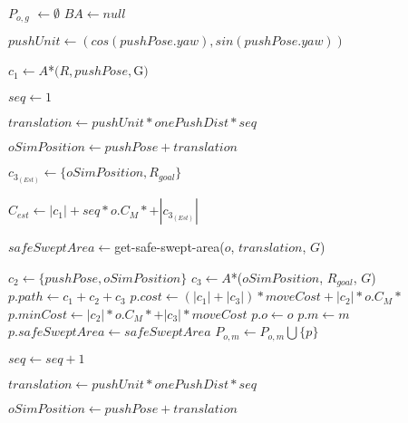 \begin{algorithm}[H]
  \begin{algorithmic}[1]


      \State $P_{o,g}$ $\gets \emptyset$
      \State $BA \gets null$

        \State $pushUnit \gets (cos(pushPose.yaw), sin(pushPose.yaw))$

        \State $c_{1} \gets A$*$(R, pushPose, $G$)$

        \State $seq \gets 1$

        \State $translation \gets pushUnit * onePushDist * seq$

        \State $oSimPosition \gets pushPose + translation$

        \State {}

        \State $c_{3_{(Est)}} \gets \{oSimPosition, R_{goal}\}$

        \State $C_{est} \gets |c_{1}| + seq * o.C_{M} * $$ + |c_{3_{(Est)}}|$

        \State $safeSweptArea \gets $get-safe-swept-area($o$, $translation$, $G$)


            \State $c_{2} \gets \{pushPose, oSimPosition\}$
            \State $c_{3} \gets A$*($oSimPosition$, $R_{goal}$, $G$)
            \State $p.path \gets c_{1} + c_{2} + c_{3}$
            \State $p.cost \gets (|c_{1}| + |c_{3}|) * moveCost + |c_{2}| * o.C_{M} * $
            \State $p.minCost \gets |c_{2}| * o.C_{M} * $$ + |c_{3}| * moveCost$
            \State $p.o \gets o$
            \State $p.m \gets m$
            \State $p.safeSweptArea \gets safeSweptArea$
            \State $P_{o,m} \gets P_{o,m} \bigcup \{p\}$
          \EndIf

          \State $seq \gets seq + 1$

          \State $translation \gets pushUnit * onePushDist * seq$

          \State $oSimPosition \gets pushPose + translation$


\end{algorithmic}
\end{algorithm}
